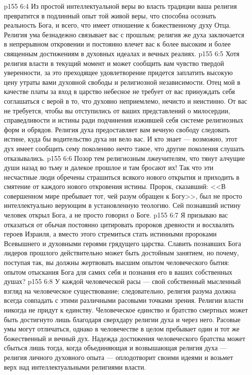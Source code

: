 \vs p155 6:4 Из простой интеллектуальной веры во власть традиции ваша религия превратится в подлинный опыт той живой веры, что способна осознать реальность Бога, и всего, что имеет отношение к божественному духу Отца. Религия ума безнадежно связывает вас с прошлым; религия же духа заключается в непрерывном откровении и постоянно влечет вас к более высоким и более священным достижениям в духовных идеалах и вечных реалиях.
\vs p155 6:5 Хотя религия власти в текущий момент и может сообщить вам чувство твердой уверенности, за это преходящее удовлетворение придется заплатить высокую цену утраты вами духовной свободы и религиозной независимости. Отец мой в качестве платы за вход в царство небесное не требует от вас принуждать себя соглашаться с верой в то, что духовно неприемлемо, нечисто и неистинно. От вас не требуется, чтобы вы отступились от ваших представлений о милосердии, справедливости и истины ради подчинения изжившей себя системе религиозных форм и обрядов. Религия духа предоставляет вам вечную свободу следовать истине, куда бы водительство духа ни вело вас. И кто знает --- возможно, этот дух имеет сообщить сему поколению нечто такое, что другие поколения слушать отказывались.
\vs p155 6:6 Позор тем религиозным лжеучителям, что тянут алчущие души назад во тьму и далекое прошлое и там бросают их! Так что эти несчастные люди обречены страшиться всякого нового открытия и приходить в смятение от каждого нового откровения истины. Пророк, сказавший: <<В совершенном мире пребывает тот, чей разум обращен к Богу>>, был не просто интеллектуально верующим в установленную теологию. Сей познавший истину человек открыл Бога, а не просто говорил о Боге.
\vs p155 6:7 Я призываю вас отказаться от обычая постоянно цитировать пророков древности и восхвалять героев Израиля, а вместо этого стремиться стать истинными пророками Всевышнего и духовными героями грядущего царства. Славить познавших Бога лидеров прошлого действительно может быть достойным занятием, но почему, поступая так, вы должны жертвовать высшим опытом человеческого бытия: опытом отыскания Бога для самих себя и познания его в ваших собственных душах?
\vs p155 6:8 У каждой человеческой расы --- свой собственный мысленный взгляд на человеческое существование; следовательно, религия разума должна всегда совпадать с этими различными расовыми точками зрения. Религии власти никогда не придут к единству. Человеческое единство и братство смертных может быть достигнуто лишь благодаря сверхдару религии духа и через него. Расовые умы могут отличаться, однако в человечестве в целом пребывает один и тот же божественный и вечный дух. Надежда достижения человеческого братства может сбыться лишь тогда, когда объединяющая и возвышающая религия духа --- религия личного духовного опыта --- оплодотворит своими идеями и возьмет верх над интеллектуальными религиями власти.

